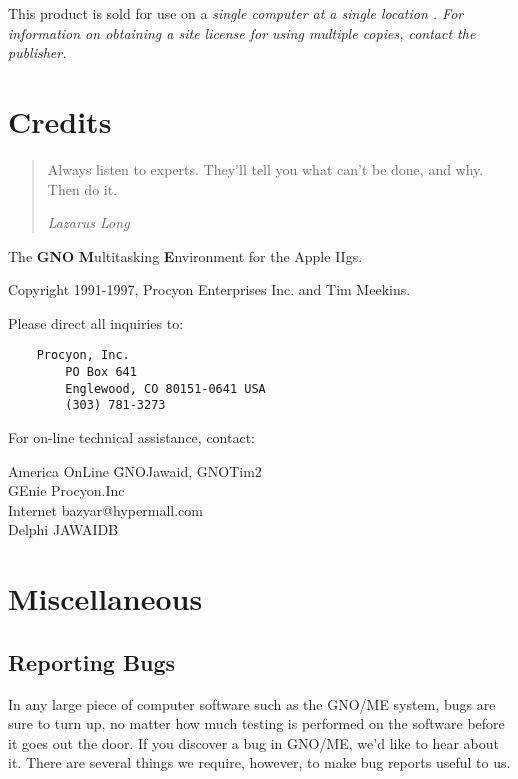 This product is sold for use on a
\em single computer
\rm at a 
\em single location .
\rm For information on obtaining a site license for using multiple copies,
contact the publisher.

\vfill

\chapter{Credits}

\begin{quote}
Always listen to experts. They'll tell you what can't be done, and why.
Then do it.

\em Lazarus Long \rm
\end{quote}

The {\bf GNO} {\bf M}ultitasking {\bf E}nvironment for the Apple IIgs.

Copyright 1991-1997, Procyon Enterprises Inc. and Tim Meekins.

Please direct all inquiries to:
\tt \begin{verbatim}
	Procyon, Inc.
        PO Box 641
        Englewood, CO 80151-0641 USA
        (303) 781-3273
\end{verbatim} \rm 

For on-line technical assistance, contact:
\begin{tabbing}
America OnLine \=GNOJawaid, GNOTim2 \\
GEnie \>Procyon.Inc \\
Internet \>bazyar@hypermall.com \\
Delphi \>JAWAIDB \\
\end{tabbing}



\chapter{Miscellaneous}

\section{Reporting Bugs}

In any large piece of computer software
such as the GNO/ME system, bugs are sure to turn up, no matter
how much testing is performed on the software before it goes out
the door. If you discover a bug in GNO/ME, we'd like to hear
about it. There are several things we require, however, to make
bug reports useful to us.

